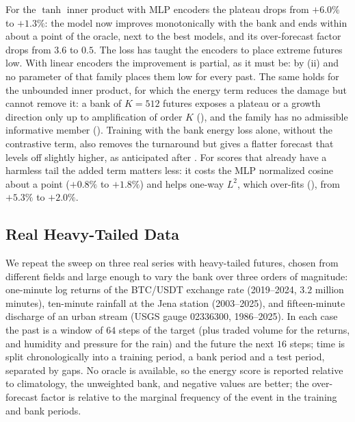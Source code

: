 \documentclass[11pt]{article}
\theoremstyle{plain}
\theoremstyle{definition}
\theoremstyle{remark}
\begin{document}
For the $\tanh$ inner product with MLP encoders the plateau drops from
$+6.0\%$ to $+1.3\%$: the model now improves monotonically with the bank and
ends within about a point of the oracle, next to the best models, and its
over-forecast factor drops from $3.6$ to $0.5$. The loss has taught the encoders to place extreme futures
low. With linear encoders the improvement is partial, as it must be: by
(ii) and  no parameter of that family
places them low for every past. The same holds for the unbounded inner
product, for which the energy term reduces the damage but cannot remove it:
a bank of $K=512$ futures exposes a plateau or a growth direction only up to
amplification of order $K$ (), and the family has no
admissible informative member (). Training with the bank
energy loss alone, without the contrastive term, also removes the turnaround
but gives a flatter forecast that levels off slightly higher, as anticipated
after . For scores that already have a harmless tail
the added term matters less: it costs the MLP normalized cosine about a point
($+0.8\%$ to $+1.8\%$) and helps one-way $L^2$, which over-fits
(), from $+5.3\%$ to $+2.0\%$.

\subsection{Real Heavy-Tailed Data}
\label{ssec:realheavy}

We repeat the sweep on three real series with heavy-tailed futures, chosen
from different fields and large enough to vary the bank over three orders of
magnitude: one-minute log returns of the BTC/USDT exchange rate
(2019--2024, $3.2$ million minutes), ten-minute rainfall at the Jena station
(2003--2025), and fifteen-minute discharge of an urban stream (USGS gauge
02336300, 1986--2025). In each case the past is a window of $64$ steps of the
target (plus traded volume for the returns, and humidity and pressure for
the rain) and the future the next $16$ steps; time is split chronologically
into a training period, a bank period and a test period, separated by gaps.
No oracle is available, so the energy score is reported relative to
climatology, the unweighted bank, and negative values are better; the
over-forecast factor is relative to the marginal frequency of the event in
the training and bank periods.
\end{document}
